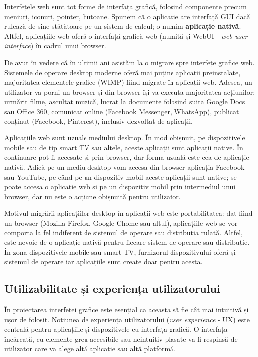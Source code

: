 Interfețele web sunt tot forme de interfața grafică, folosind componente precum meniuri, iconuri, pointer, butoane. Spunem că o aplicație are interfață GUI dacă rulează de sine stătătoare pe un sistem de calcul; o numim \textbf{aplicație nativă}. Altfel, aplicațiile web oferă o interfață grafică web (numită și WebUI - \textit{web user interface}) în cadrul unui browser.

De avut în vedere că în ultimii ani asistăm la o migrare spre interfețe grafice web. Sistemele de operare desktop moderne oferă mai puține aplicații preinstalate, majoritatea elementele grafice (WIMP) fiind migrate în aplicații web. Adesea, un utilizator va porni un browser și din browser își va executa majoritatea acțiunilor: urmărit filme, ascultat muzică, lucrat la documente folosind suita Google Docs sau Office 360, comunicat online (Facebook Messenger, WhatsApp), publicat conținut (Facebook, Pinterest), inclusiv dezvoltat de aplicații.

Aplicațiile web sunt uzuale mediului desktop. În mod obișnuit, pe dispozitivele mobile sau de tip smart TV sau altele, aceste aplicații sunt aplicații native. În continuare pot fi accesate și prin browser, dar forma uzuală este cea de aplicație nativă. Adică pe un mediu desktop vom accesa din browser aplicația Facebook sau YouTube, pe când pe un dispozitiv mobil aceste aplicații sunt native; se poate accesa o aplicație web și pe un dispozitiv mobil prin intermediul unui browser, dar nu este o acțiune obișnuită pentru utilizator.

Motivul migrării aplicațiilor desktop în aplicații web este portabilitatea: dat fiind un browser (Mozilla Firefox, Google Chome sau altul), aplicațiile web se vor comporta la fel indiferent de sistemul de operare sau distribuția rulată. Altfel, este nevoie de o aplicație nativă pentru fiecare sistem de operare sau distribuție. În zona dispozitivele mobile sau smart TV, furnizorul dispozitivului oferă și sistemul de operare iar aplicațiile sunt create doar pentru acesta.

\subsection{Utilizabilitate și experiența utilizatorului}
\label{sec:ui:ux}

În proiectarea interfeței grafice este esențial ca aceasta să fie cât mai intuitivă și ușor de folosit. Noțiunea de experiența utilizatorului (\textit{user experience} - UX) este centrală pentru aplicațiile și dispozitivele cu interfața grafică. O interfața încărcată, cu elemente greu accesibile sau neintuitiv plasate va fi respinsă de utilizator care va alege altă aplicație sau altă platformă.


